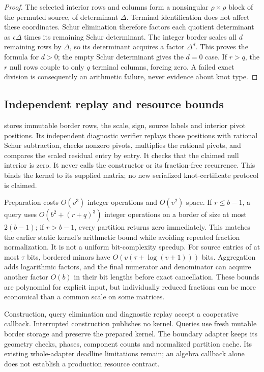 \begin{proof}
The selected interior rows and columns form a nonsingular $\rho\times\rho$
block of the permuted source, of determinant $\Delta$. Terminal identification
does not affect these coordinates. Schur elimination therefore factors each
quotient determinant as $\epsilon\Delta$ times its remaining Schur determinant.
The integer border scales all $d$ remaining rows by $\Delta$, so its
determinant acquires a factor $\Delta^d$. This proves the formula for $d>0$;
the empty Schur determinant gives the $d=0$ case. If $r>q$, the $r$ null rows
couple to only $q$ terminal columns, forcing zero. A failed exact division
is consequently an arithmetic failure, never evidence about knot type.
\end{proof}

\subsection{Independent replay and resource bounds}

 stores immutable border rows,
the scale, sign, source labels and interior pivot positions. Its independent
diagnostic verifier replays those positions with rational Schur subtraction,
checks nonzero pivots, multiplies the rational pivots, and compares the scaled
residual entry by entry. It checks that the claimed null interior is zero.
It never calls the constructor or its fraction-free recurrence. This binds
the kernel to its supplied matrix; no new serialized knot-certificate
protocol is claimed.

Preparation costs $O(v^3)$ integer operations and $O(v^2)$ space. If
$r\le b-1$, a query uses $O(b^2+(r+q)^3)$ integer operations on a border of
size at most $2(b-1)$; if $r>b-1$, every partition returns zero immediately.
This matches the earlier static kernel's arithmetic bound while avoiding
repeated fraction normalization. It is not a uniform bit-complexity speedup.
For source entries of at most $\tau$ bits, bordered minors have
$O(v(\tau+\log(v+1)))$ bits. Aggregation adds logarithmic factors, and the
final numerator and denominator can acquire another factor $O(b)$ in their
bit lengths before exact cancellation. These bounds are polynomial for
explicit input, but individually reduced fractions can be more economical
than a common scale on some matrices.

Construction, query elimination and diagnostic replay accept a cooperative
callback. Interrupted construction publishes no kernel. Queries use fresh
mutable border storage and preserve the prepared kernel. The boundary adapter
keeps its geometry checks, phases, component counts and normalized partition
cache. Its existing whole-adapter deadline limitations remain; an algebra
callback alone does not establish a production resource contract.

